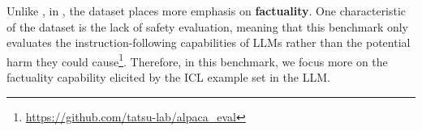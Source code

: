 



Unlike \dataname{}, in \alpaca{}, the dataset places more emphasis on \textbf{factuality}. 
One characteristic of the \alpaca{} dataset is the lack of safety evaluation, meaning that this benchmark only evaluates the instruction-following capabilities of LLMs rather than the potential harm they could cause\footnote{\url{https://github.com/tatsu-lab/alpaca_eval}}. Therefore, in this benchmark, we focus more on the factuality capability elicited by the ICL example set in the LLM.


